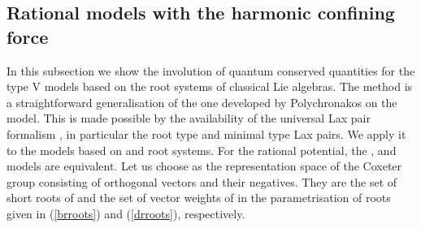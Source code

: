 \documentclass[a4paper,12pt]{article}
\begin{document}
\subsection{Rational  models with the harmonic confining force}
In this subsection we show the involution of quantum
conserved quantities  for the type V models  based on the root systems of
classical Lie algebras. The method is a straightforward generalisation of
the one developed by Polychronakos on the \coordHE{} model.
This is made possible by the availability of the universal Lax pair
formalism \cite{bcs2,bms}, in particular the root type and minimal
type Lax pairs.
We apply it to the models based on \coordHE{} and \coordHE{} root systems.
For the rational potential, the \coordHE{}, \coordHE{} and \coordHE{} models are
equivalent.
Let us choose \coordHE{} as the representation space of the Coxeter group
consisting of  orthogonal vectors and their negatives.
They are the set of short roots of \coordHE{} and the set of vector weights of
\coordHE{} in the parametrisation of roots given in (\ref{brroots}) and
(\ref{drroots}), respectively.
\end{document}
